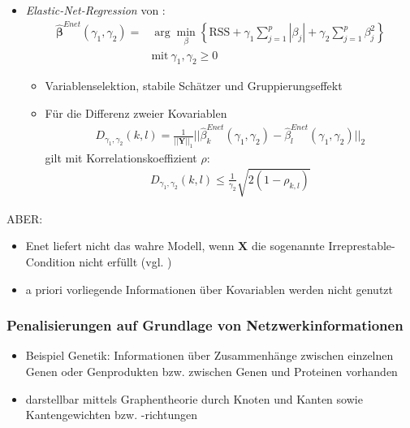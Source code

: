 \documentclass{beamer}
\begin{document}
\begin{frame}
	\begin{itemize}
	\item \textit{Elastic-Net-Regression} von \cite{zou_regularization_2005}:
	\begin{align*}
	\boldsymbol{\hat{\beta}}^{Enet}(\gamma_1, \gamma_2)=&\arg \displaystyle\min_{\beta} \left\lbrace \text{RSS}  + \gamma_1 \sum_{j=1}^{p}|\beta_j| + \gamma_2 \sum_{j=1}^{p}\beta_j^2 \right\rbrace\\ &\text{mit} \ \gamma_1,\gamma_2 \ge 0
	\end{align*}
	\begin{itemize}
	\item Variablenselektion, stabile Schätzer und Gruppierungseffekt
	\item Für die Differenz zweier Kovariablen
	\begin{align*}
	D_{\gamma_1,\gamma_2}(k,l)=\frac{1}{||\mathbf{Y}||_1}||\hat{\beta}_k^{Enet}(\gamma_1,\gamma_2)-\hat{\beta}_l^{Enet}(\gamma_1,\gamma_2)||_2
	\end{align*}
	gilt mit Korrelationskoeffizient $\rho$:
	\begin{align*}
	D_{\gamma_1,\gamma_2}(k,l) \leq \frac{1}{\gamma_2}\sqrt{2(1-\rho_{k,l})}
	\end{align*}
	\end{itemize}
	\end{itemize}
\end{frame}


\begin{frame}
	ABER:
	\begin{itemize}
	\item Enet liefert nicht das wahre Modell, wenn $\mathbf{X}$ die sogenannte Irreprestable-Condition nicht erfüllt (vgl. \cite{jia_2008Enet_Consistency})
	\item a priori vorliegende Informationen über Kovariablen werden nicht genutzt
	\end{itemize}
\end{frame}

\begin{frame}
\frametitle{Penalisierungen auf Grundlage von Netzwerkinformationen}
	\begin{itemize}
	\item  Beispiel Genetik: Informationen über Zusammenhänge zwischen einzelnen Genen oder Genprodukten bzw. zwischen Genen und Proteinen vorhanden
	\item darstellbar mittels Graphentheorie durch Knoten und Kanten sowie Kantengewichten bzw. -richtungen
	\end{itemize}
\end{frame}
\end{document}
